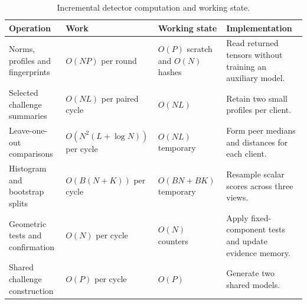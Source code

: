 \begin{table}[t]\centering\footnotesize
\caption{Incremental detector computation and working state.}\label{tab:complexity}
\begin{tabular}{>{\raggedright\arraybackslash}p{3.6cm}>{\raggedright\arraybackslash}p{3.6cm}>{\raggedright\arraybackslash}p{3.0cm}>{\raggedright\arraybackslash}p{5.3cm}}\toprule
Operation & Work & Working state & Implementation \\ \midrule
Norms, profiles and fingerprints & $O(NP)$ per round & $O(P)$ scratch and $O(N)$ hashes & Read returned tensors without training an auxiliary model. \\
Selected challenge summaries & $O(NL)$ per paired cycle & $O(NL)$ & Retain two small profiles per client. \\
Leave-one-out comparisons & $O(N^2(L+\log N))$ per cycle & $O(NL)$ temporary & Form peer medians and distances for each client. \\
Histogram and bootstrap splits & $O(B(N+K))$ per cycle & $O(BN+BK)$ temporary & Resample scalar scores across three views. \\
Geometric tests and confirmation & $O(N)$ per cycle & $O(N)$ counters & Apply fixed-component tests and update evidence memory. \\
Shared challenge construction & $O(P)$ per cycle & $O(P)$ & Generate two shared models. \\
\bottomrule\end{tabular}\end{table}
